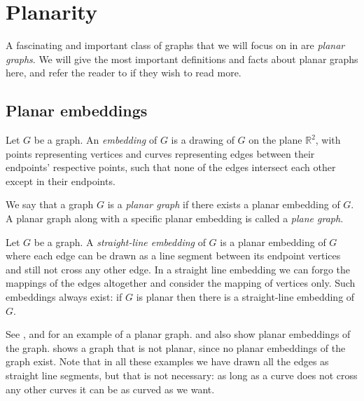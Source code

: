 \section{Planarity}
\label{section:planar-graphs}
A fascinating and important class of graphs that we will focus on in  are \emph{planar graphs}. We will give the most important definitions and facts about planar graphs here, and refer the reader to \cite{source:planar_graphs} if they wish to read more.

\subsection{Planar embeddings}
\begin{definition}[Embedding]
    Let $G$ be a graph. An \emph{embedding} of $G$ is a drawing of $G$ on the plane $\mathbb{R}^2$, with points representing vertices and curves representing edges between their endpoints' respective points, such that none of the edges intersect each other except in their endpoints.
\end{definition}

\begin{definition}
    We say that a graph $G$ is a \emph{planar graph} if there exists a planar embedding of $G$. A planar graph along with a specific planar embedding is called a \emph{plane graph}.
\end{definition}

\begin{definition}
    Let $G$ be a graph. A \emph{straight-line embedding} of $G$ is a planar embedding of $G$ where each edge can be drawn as a line segment between its endpoint vertices and still not cross any other edge. In a straight line embedding we can forgo the mappings of the edges altogether and consider the mapping of vertices only. Such embeddings always exist: if $G$ is planar then there is a straight-line embedding of $G$.
\end{definition}

See ,  and  for an example of a planar graph.  and  also show planar embeddings of the graph.  shows a graph that is not planar, since no planar embeddings of the graph exist. Note that in all these examples we have drawn all the edges as straight line segments, but that is not necessary: as long as a curve does not cross any other curves it can be as curved as we want.


